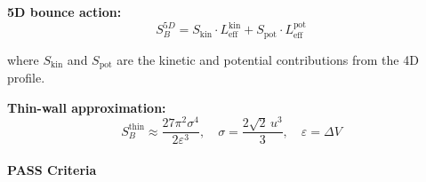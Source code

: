 \documentclass[
  11pt,
]{article}
\begin{document}
\textbf{5D bounce action:}
\[S_B^{5D} = S_{\text{kin}} \cdot L_{\text{eff}}^{\text{kin}} + S_{\text{pot}} \cdot L_{\text{eff}}^{\text{pot}} \tag{140}\]

where \(S_{\text{kin}}\) and \(S_{\text{pot}}\) are the kinetic and
potential contributions from the 4D profile.

\textbf{Thin-wall approximation:}
\[S_B^{\text{thin}} \approx \frac{27\pi^2\sigma^4}{2\varepsilon^3}, \quad \sigma = \frac{2\sqrt{2}\,u^3}{3}, \quad \varepsilon = \Delta V \tag{141}\]

\bigskip

\hypertarget{pass-criteria-7}{%
\paragraph{PASS Criteria}\label{pass-criteria-7}}
\end{document}

